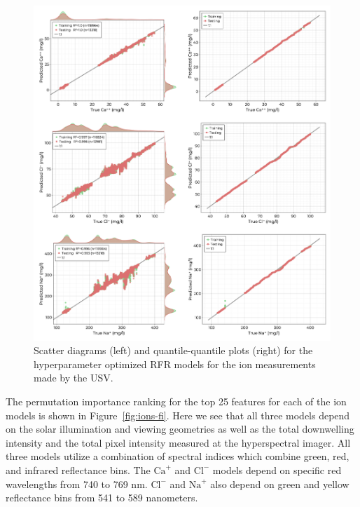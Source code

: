 \documentclass[sensors,article,submit,pdftex,moreauthors]{Definitions/mdpi}
\begin{document}
\begin{figure}
\centering
\includegraphics[width=\columnwidth]{paper/figures/results/fits/ions-fitres.png}
\caption{Scatter diagrams (left) and quantile-quantile plots (right) for the hyperparameter optimized RFR models for the ion measurements made by the USV.\label{fig:ions-fit}}
\end{figure}  

The permutation importance ranking for the top 25 features for each of the ion models is shown in Figure~\ref{fig:ions-fi}. Here we see that all three models depend on the solar illumination and viewing geometries as well as the total downwelling intensity and the total pixel intensity measured at the hyperspectral imager. All three models utilize a combination of spectral indices which combine green, red, and infrared reflectance bins. The $\textrm{Ca}^{+}$ and $\textrm{Cl}^{-}$ models depend on specific red wavelengths from 740 to 769 nm. $\textrm{Cl}^{-}$ and $\textrm{Na}^{+}$ also depend on green and yellow reflectance bins from 541 to 589 nanometers.
\end{document}
